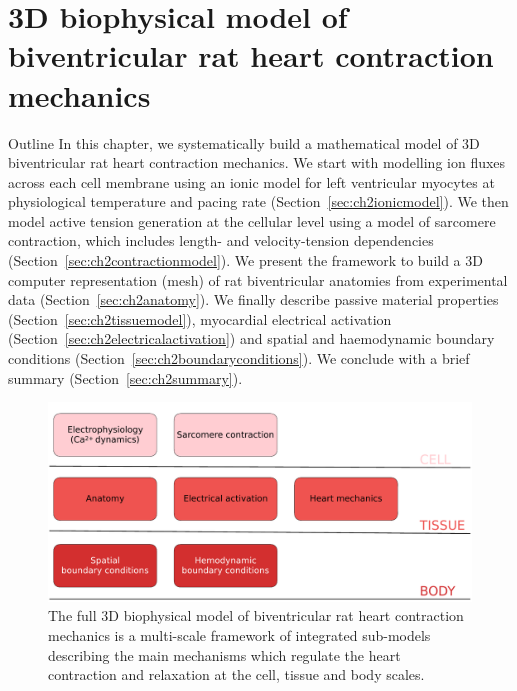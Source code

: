 \chapter{3D biophysical model of biventricular rat heart contraction 
mechanics}\label{cha:chapter02}
%
%
%
\begin{remark}{Outline}
    In this chapter, we systematically build a mathematical model of $3$D biventricular rat heart contraction mechanics. We start with modelling ion fluxes across each cell membrane using an ionic model for left ventricular myocytes at physiological temperature and pacing rate (Section~\ref{sec:ch2ionicmodel}). We then model active tension generation at the cellular level using a model of sarcomere contraction, which includes length- and velocity-tension dependencies (Section~\ref{sec:ch2contractionmodel}). We present the framework to build a $3$D computer representation (mesh) of rat biventricular anatomies from experimental data (Section~\ref{sec:ch2anatomy}). We finally describe passive material properties (Section~\ref{sec:ch2tissuemodel}), myocardial electrical activation (Section~\ref{sec:ch2electricalactivation}) and spatial and haemodynamic boundary conditions (Section~\ref{sec:ch2boundaryconditions}). We conclude with a brief summary (Section~\ref{sec:ch2summary}).
\end{remark}

\begin{figure}[ht!]
    \myfloatalign
    \includegraphics[width=\textwidth]{figures/chapter02/methods_schematic.pdf}
    \caption{The full $3$D biophysical model of biventricular rat heart contraction mechanics is a multi-scale framework of integrated sub-models describing the main mechanisms which regulate the heart contraction and relaxation at the cell, tissue and body scales.}
    \label{fig:methodssummaryinscale}
\end{figure}


